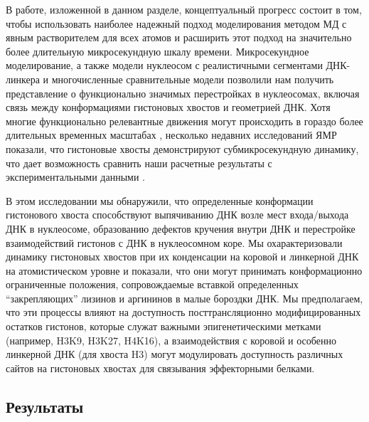     В работе, изложенной в данном разделе, концептуальный прогресс состоит в том, чтобы использовать наиболее надежный подход моделирования методом МД с явным  растворителем для всех атомов  и расширить этот подход на значительно более длительную микросекундную шкалу времени. Микросекундное моделирование, а также модели нуклеосом с реалистичными сегментами ДНК-линкера и многочисленные сравнительные модели позволили нам получить представление о функционально значимых перестройках в нуклеосомах, включая связь между конформациями гистоновых хвостов и геометрией ДНК. Хотя многие функционально релевантные движения могут происходить в гораздо более длительных временных масштабах \cite{choy_structural_2012}, несколько недавних исследований ЯМР показали, что гистоновые хвосты демонстрируют субмикросекундную динамику, что дает возможность сравнить наши расчетные результаты с экспериментальными данными \cite{kato_characterization_2009,zhou_histone_2012,gao_histone_2013}.

    В этом исследовании мы обнаружили, что определенные конформации гистонового хвоста способствуют выпячиванию ДНК возле мест входа/выхода ДНК в нуклеосоме, образованию дефектов кручения внутри ДНК и перестройке взаимодействий гистонов с ДНК в нуклеосомном коре. Мы охарактеризовали динамику гистоновых хвостов при их конденсации на коровой и линкерной ДНК на атомистическом уровне и показали, что они могут принимать конформационно ограниченные положения, сопровождаемые вставкой определенных ``закрепляющих'' лизинов и аргининов в малые бороздки ДНК. Мы предполагаем, что эти процессы влияют на доступность посттрансляционно модифицированных остатков гистонов, которые служат важными эпигенетическими метками (например, H3K9, H3K27, H4K16), а взаимодействия с коровой и особенно линкерной ДНК (для хвоста H3) могут модулировать доступность различных сайтов на гистоновых хвостах для связывания эффекторными белками.

\subsection{Результаты}

